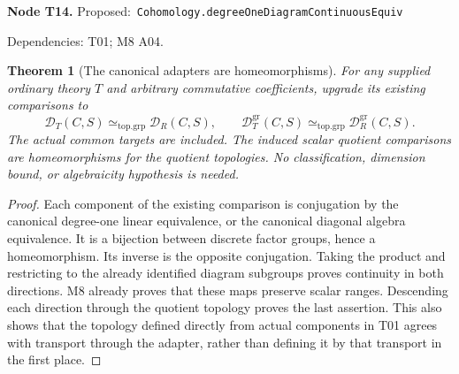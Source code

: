 \documentclass[11pt]{article}
\newtheorem{theorem}{Theorem}[section]
\theoremstyle{remark}\newtheorem{remark}[theorem]{Remark}
\newcommand{\D}{\mathcal D}
\newcommand{\DG}{\mathcal D^{\mathrm{gr}}}
\newcommand{\code}[1]{{\normalfont\nolinkurl{#1}}}
\newcommand{\node}[3]{\par\Needspace{8\baselineskip}\smallskip\noindent\textbf{Node #1.}\quad
 \textsf{Proposed:}\ \code{#2}\par\noindent
 \textsf{Dependencies:} #3.\par\smallskip}
\begin{document}
\node{T14}{Cohomology.degreeOneDiagramContinuousEquiv}{T01; M8 A04}
\begin{theorem}[The canonical adapters are homeomorphisms]\label{thm:t14}
For any supplied ordinary theory $T$ and arbitrary commutative
coefficients, upgrade its existing comparisons to
\[
 \D_T(C,S)\simeq_{\mathrm{top.grp}}\D_R(C,S),\qquad
 \DG_T(C,S)\simeq_{\mathrm{top.grp}}\DG_R(C,S).
\]
The actual common targets are included. The induced scalar quotient
comparisons are homeomorphisms for the quotient topologies. No
classification, dimension bound, or algebraicity hypothesis is needed.
\end{theorem}
\begin{proof}
Each component of the existing comparison is conjugation by the
canonical degree-one linear equivalence, or the canonical diagonal
algebra equivalence. It is a bijection between discrete factor groups,
hence a homeomorphism. Its inverse is the opposite conjugation.
Taking the product and restricting to the already identified diagram
subgroups proves continuity in both directions. M8 already proves
that these maps preserve scalar ranges. Descending each direction
through the quotient topology proves the last assertion. This also
shows that the topology defined directly from actual components in
T01 agrees with transport through the adapter, rather than defining
it by that transport in the first place.
\end{proof}
\end{document}
